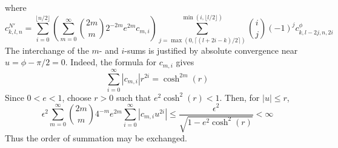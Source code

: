 \documentclass[a4paper]{amsart}
\begin{document}
where
\begin{equation*}
c^{N'}_{k,l,n}=\sum_{i=0}^{\lfloor n/2\rfloor}\left(\sum_{m=0}^{\infty}\binom{2m}{m}2^{-2m}e^{2m}c_{m,i}\right)\sum_{j=\max(0,\lceil(l+2i-k)/2\rceil)}^{\min(i,\lfloor l/2\rfloor)}\binom{i}{j}(-1)^jc^{\phi}_{k,l-2j,n,2i}
\end{equation*}
The interchange of the $m$- and $i$-sums is justified by absolute convergence near $u=\phi-\pi/2=0$. Indeed, the formula for $c_{m,i}$ gives
\begin{equation*}
\sum_{i=0}^{\infty}|c_{m,i}|r^{2i}
=\cosh^{2m}(r)
\end{equation*}
Since $0<e<1$, choose $r>0$ such that $e^2\cosh^2(r)<1$. Then, for $|u|\leq r$,
\begin{equation*}
\epsilon^2\sum_{m=0}^{\infty}
\binom{2m}{m}4^{-m}e^{2m}
\sum_{i=0}^{\infty}|c_{m,i}u^{2i}|
\leq
\frac{\epsilon^2}{\sqrt{1-e^2\cosh^2(r)}}
<\infty
\end{equation*}
Thus the order of summation may be exchanged.
\end{document}
